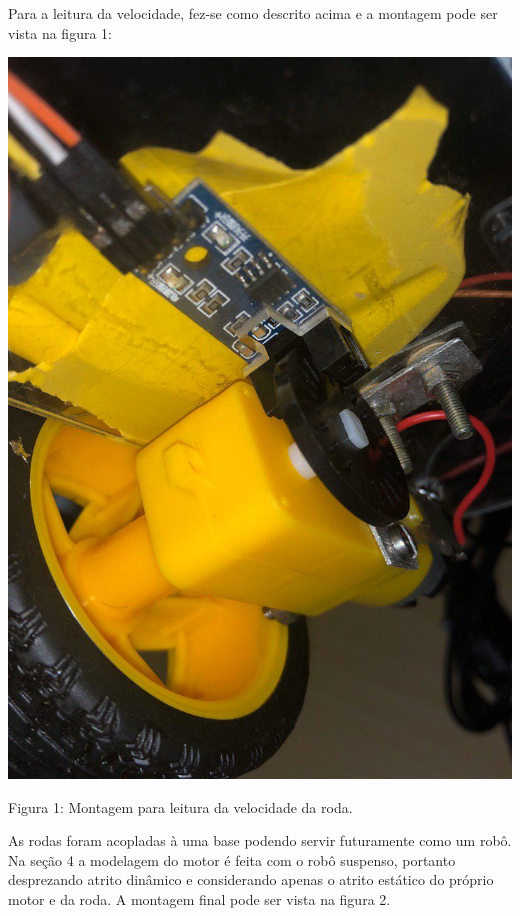 \documentclass{article}
\begin{document}
Para a leitura da velocidade, fez-se como descrito acima e a montagem pode ser vista na figura 1:
\begin{center}
\centering
  \includegraphics[scale=0.15]{imagens/encoderRoda.jpg}
  
  \caption{Figura 1: Montagem para leitura da velocidade da roda.}
\end{center}

As rodas foram acopladas à uma base podendo servir futuramente como um robô. Na seção 4 a modelagem do motor é feita com o robô suspenso, portanto desprezando atrito dinâmico e considerando apenas o atrito estático do próprio motor e da roda. A montagem final pode ser vista na figura 2.
\end{document}
